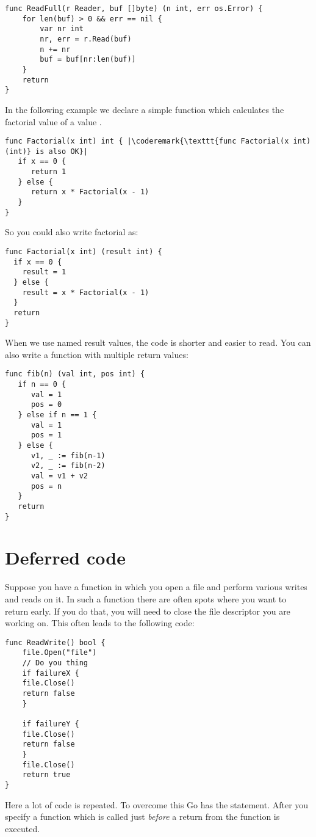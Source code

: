 \begin{lstlisting}
func ReadFull(r Reader, buf []byte) (n int, err os.Error) {
    for len(buf) > 0 && err == nil {
        var nr int
        nr, err = r.Read(buf)
        n += nr
        buf = buf[nr:len(buf)]
    }
    return
}
\end{lstlisting}
In the following example we declare a simple function which calculates
the factorial value of a value .
\begin{lstlisting}
func Factorial(x int) int { |\coderemark{\texttt{func Factorial(x int) (int)} is also OK}|
   if x == 0 {
      return 1
   } else {
      return x * Factorial(x - 1)
   }
}
\end{lstlisting}
So you could also write factorial as:
\begin{lstlisting}
func Factorial(x int) (result int) {
  if x == 0 {
    result = 1	
  } else {
    result = x * Factorial(x - 1)
  }
  return
}
\end{lstlisting}
When we use named result values, the code is shorter and
easier to read.
You can also write a function with multiple return values:
\begin{lstlisting}
func fib(n) (val int, pos int) {
   if n == 0 {
      val = 1
      pos = 0
   } else if n == 1 {
      val = 1
      pos = 1
   } else {
      v1, _ := fib(n-1)
      v2, _ := fib(n-2)
      val = v1 + v2
      pos = n
   }
   return
}
\end{lstlisting}

\section{Deferred code}
Suppose you have a function in which you open a file and perform various
writes and reads on it. In such a function there are often spots where
you want to return early. If you do that, you will need to close the file
descriptor you are working on. This often leads to the following code:
\begin{lstlisting}[caption=Without defer]
func ReadWrite() bool {
    file.Open("file")
    // Do you thing
    if failureX {
	file.Close()
	return false
    }

    if failureY {
	file.Close()
	return false
    }
    file.Close()
    return true
}
\end{lstlisting}
Here a lot of code is repeated. To overcome this Go has the
 statement. After
 you specify a function which is called just \emph{before} a
return from the function is executed.


